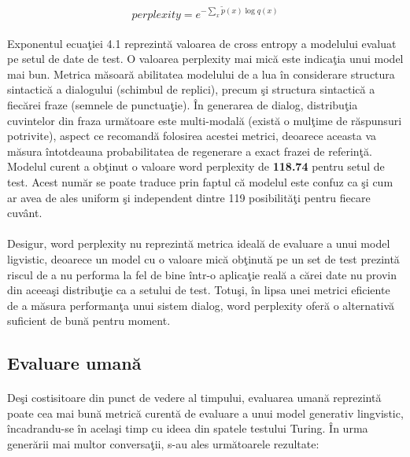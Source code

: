 \begin{equation}
perplexity = e^{-\sum_{x}\tilde{p}(x)\log{q(x)}}
\end{equation}

\paragraph{}
Exponentul ecua\c tiei 4.1 reprezint\u a valoarea de cross entropy a modelului evaluat pe setul de date de test. O valoarea perplexity mai mic\u a este indica\c tia unui model mai bun. Metrica m\u asoar\u a abilitatea modelului de a lua \^ in considerare structura sintactic\u a a dialogului (schimbul de replici), precum \c si structura sintactic\u a a fiec\u arei fraze (semnele de punctua\c tie). \^ In generarea de dialog, distribu\c tia cuvintelor din fraza urm\u atoare este multi-modal\u a (exist\u a o mul\c time de r\u aspunsuri potrivite), aspect ce recomand\u a folosirea acestei metrici, deoarece aceasta va m\u asura \^ intotdeauna probabilitatea de regenerare a exact frazei de referin\c t\u a. Modelul curent a ob\c tinut o valoare word perplexity de \textbf{118.74} pentru setul de test. Acest num\u ar se poate traduce prin faptul c\u a modelul este confuz ca \c si cum ar avea de ales uniform \c si independent dintre 119 posibilit\u a\c ti pentru fiecare cuv\^ ant.

\paragraph{}
Desigur, word perplexity nu reprezint\u a metrica ideal\u a de evaluare a unui model ligvistic, deoarece un model cu o valoare mic\u a ob\c tinut\u a pe un set de test prezint\u a riscul de a nu performa la fel de bine \^ intr-o aplica\c tie real\u a a c\u arei date nu provin din aceea\c si distribu\c tie ca a setului de test. Totu\c si, \^ in lipsa unei metrici eficiente de a m\u asura performan\c ta unui sistem dialog, word perplexity ofer\u a o alternativ\u a suficient de bun\u a pentru moment.

\subsection{Evaluare uman\u a}

\paragraph{}
De\c si costisitoare din punct de vedere al timpului, evaluarea uman\u a reprezint\u a poate cea mai bun\u a metric\u a curent\u a de evaluare a unui model generativ lingvistic, \^ incadrandu-se \^ in acela\c si timp cu ideea din spatele testului Turing. \^ In urma gener\u arii mai multor conversa\c tii, s-au ales urm\u atoarele rezultate:

